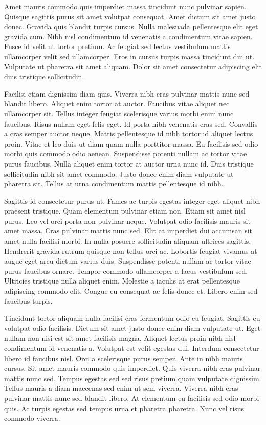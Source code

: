 \documentclass[11pt,a4paper]{article}
\begin{document}
Amet mauris commodo quis imperdiet massa tincidunt nunc pulvinar sapien. Quisque sagittis purus sit amet volutpat consequat. Amet dictum sit amet justo donec. Gravida quis blandit turpis cursus. Nulla malesuada pellentesque elit eget gravida cum. Nibh nisl condimentum id venenatis a condimentum vitae sapien. Fusce id velit ut tortor pretium. Ac feugiat sed lectus vestibulum mattis ullamcorper velit sed ullamcorper. Eros in cursus turpis massa tincidunt dui ut. Vulputate ut pharetra sit amet aliquam. Dolor sit amet consectetur adipiscing elit duis tristique sollicitudin.

Facilisi etiam dignissim diam quis. Viverra nibh cras pulvinar mattis nunc sed blandit libero. Aliquet enim tortor at auctor. Faucibus vitae aliquet nec ullamcorper sit. Tellus integer feugiat scelerisque varius morbi enim nunc faucibus. Risus nullam eget felis eget. Id porta nibh venenatis cras sed. Convallis a cras semper auctor neque. Mattis pellentesque id nibh tortor id aliquet lectus proin. Vitae et leo duis ut diam quam nulla porttitor massa. Eu facilisis sed odio morbi quis commodo odio aenean. Suspendisse potenti nullam ac tortor vitae purus faucibus. Nulla aliquet enim tortor at auctor urna nunc id. Duis tristique sollicitudin nibh sit amet commodo. Justo donec enim diam vulputate ut pharetra sit. Tellus at urna condimentum mattis pellentesque id nibh.

Sagittis id consectetur purus ut. Fames ac turpis egestas integer eget aliquet nibh praesent tristique. Quam elementum pulvinar etiam non. Etiam sit amet nisl purus. Leo vel orci porta non pulvinar neque. Volutpat odio facilisis mauris sit amet massa. Cras pulvinar mattis nunc sed. Elit at imperdiet dui accumsan sit amet nulla facilisi morbi. In nulla posuere sollicitudin aliquam ultrices sagittis. Hendrerit gravida rutrum quisque non tellus orci ac. Lobortis feugiat vivamus at augue eget arcu dictum varius duis. Suspendisse potenti nullam ac tortor vitae purus faucibus ornare. Tempor commodo ullamcorper a lacus vestibulum sed. Ultricies tristique nulla aliquet enim. Molestie a iaculis at erat pellentesque adipiscing commodo elit. Congue eu consequat ac felis donec et. Libero enim sed faucibus turpis.

Tincidunt tortor aliquam nulla facilisi cras fermentum odio eu feugiat. Sagittis eu volutpat odio facilisis. Dictum sit amet justo donec enim diam vulputate ut. Eget nullam non nisi est sit amet facilisis magna. Aliquet lectus proin nibh nisl condimentum id venenatis a. Volutpat est velit egestas dui. Interdum consectetur libero id faucibus nisl. Orci a scelerisque purus semper. Ante in nibh mauris cursus. Sit amet mauris commodo quis imperdiet. Quis viverra nibh cras pulvinar mattis nunc sed. Tempus egestas sed sed risus pretium quam vulputate dignissim. Tellus mauris a diam maecenas sed enim ut sem viverra. Viverra nibh cras pulvinar mattis nunc sed blandit libero. At elementum eu facilisis sed odio morbi quis. Ac turpis egestas sed tempus urna et pharetra pharetra. Nunc vel risus commodo viverra.
\end{document}
